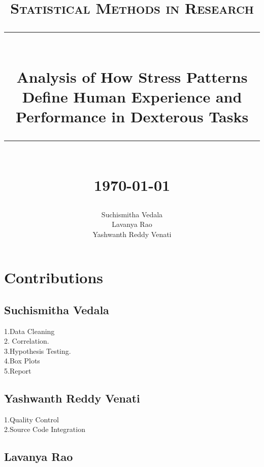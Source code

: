 \documentclass[12pt,epsf]{report}
\newcommand{\HRule}[1]{\rule{\linewidth}{#1}}
\begin{document}
\title{ \large \textsc{Statistical Methods in Research}
		\\ [2.0cm]
		\HRule{1pt} \\
		\LARGE \textbf{{Analysis of How Stress Patterns Define Human Experience and Performance in Dexterous Tasks}}
		\HRule{1pt} \\ [0.5cm]
		\normalsize \today \vspace*{5\baselineskip}}

\date{}

\author{
		Suchismitha Vedala \\ 
		Lavanya Rao \\
		Yashwanth Reddy Venati }

\maketitle
\tableofcontents
\newpage
\section*{Contributions}
\subsection*{Suchismitha Vedala}
1.Data Cleaning\\
2. Correlation.\\
3.Hypothesis Testing.\\
4.Box Plots\\
5.Report\\
\subsection*{Yashwanth Reddy Venati}
1.Quality Control\\
2.Source Code Integration\\
\subsection*{Lavanya Rao}
\newpage
\sectionfont{ \scshape}
\subsectionfont{\centering}

\end{document}
